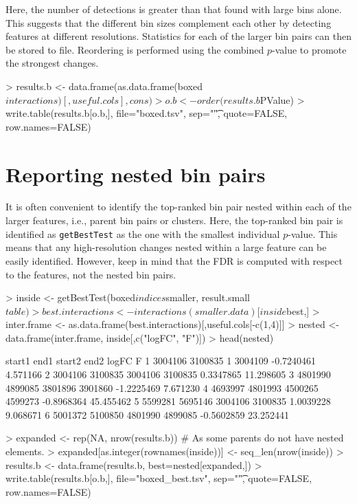 \documentclass[12pt]{report}
\renewenvironment{Schunk}{\vspace{0pt}}{\vspace{0pt}}
\newcommand{\code}[1]{{\small\texttt{#1}}}
\begin{document}
Here, the number of detections is greater than that found with large bins alone.
This suggests that the different bin sizes complement each other by detecting features at different resolutions.
Statistics for each of the larger bin pairs can then be stored to file. 
Reordering is performed using the combined $p$-value to promote the strongest changes.

\begin{Schunk}
\begin{Sinput}
> results.b <- data.frame(as.data.frame(boxed$interactions)[,useful.cols], cons)
> o.b <- order(results.b$PValue)
> write.table(results.b[o.b,], file="boxed.tsv", sep="\t", quote=FALSE, row.names=FALSE)
\end{Sinput}
\end{Schunk}

\section{Reporting nested bin pairs}
\label{sec:nesting}
It is often convenient to identify the top-ranked bin pair nested within each of the larger features, i.e., parent bin pairs or clusters.
Here, the top-ranked bin pair is identified as \code{getBestTest} as the one with the smallest individual $p$-value.
This means that any high-resolution changes nested within a large feature can be easily identified.
However, keep in mind that the FDR is computed with respect to the features, not the nested bin pairs.

\begin{Schunk}
\begin{Sinput}
> inside <- getBestTest(boxed$indices$smaller, result.small$table)
> best.interactions <- interactions(smaller.data)[inside$best,]
> inter.frame <- as.data.frame(best.interactions)[,useful.cols[-c(1,4)]]
> nested <- data.frame(inter.frame, inside[,c("logFC", "F")])
> head(nested)
\end{Sinput}
\begin{Soutput}
   start1    end1  start2    end2      logFC         F
1 3004106 3100835       1 3004109 -0.7240461  4.571166
2 3004106 3100835 3004106 3100835  0.3347865 11.298605
3 4801990 4899085 3801896 3901860 -1.2225469  7.671230
4 4693997 4801993 4500265 4599273 -0.8968364 45.455462
5 5599281 5695146 3004106 3100835  1.0039228  9.068671
6 5001372 5100850 4801990 4899085 -0.5602859 23.252441
\end{Soutput}
\begin{Sinput}
> expanded <- rep(NA, nrow(results.b)) # As some parents do not have nested elements.
> expanded[as.integer(rownames(inside))] <- seq_len(nrow(inside))
> results.b <- data.frame(results.b, best=nested[expanded,])
> write.table(results.b[o.b,], file="boxed_best.tsv", sep="\t", quote=FALSE, row.names=FALSE)
\end{Sinput}
\end{Schunk}
\end{document}
